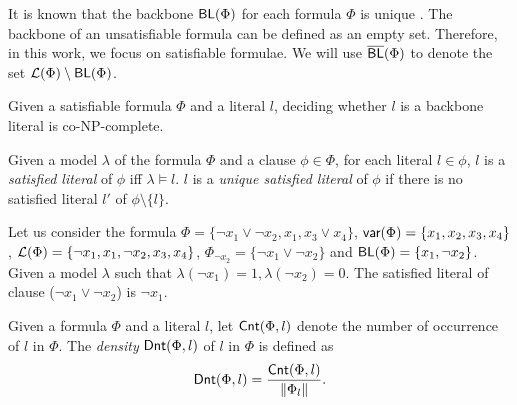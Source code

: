 It is known that the backbone $\textsf{BL}(\Phi)$ for each formula $\Phi$ is unique \cite{JLM15}.
The backbone of an unsatisfiable formula can be defined as an empty set. Therefore, in this work, we focus on satisfiable formulae.
We will use $\overline{\textsf{BL}}(\Phi)$ to denote the set
$\Lit(\Phi)\setminus \BL(\Phi)$.

\begin{theorem}
\label{thm:co-NP}\cite{Jan10}
Given a satisfiable formula $\Phi$ and a literal $l$, deciding whether $l$ is a backbone literal is co-NP-complete.
\end{theorem}

\begin{definition}
Given a model $\lambda$ of the formula $\Phi$ and a clause $\phi\in\Phi$, for each literal $l\in\phi$, $l$ is a \emph{satisfied literal}
of $\phi$ iff $\lambda\models l$. $l$ is a \emph{unique satisfied literal} of $\phi$ if there is no satisfied literal $l'$ of $\phi\setminus\{l\}$.
\end{definition}

Let us consider the formula $\Phi=\{\neg x_1 \vee \neg x_2, x_1, x_3 \vee x_4\}$,
$\textsf{var}(\Phi)=\{x_1, x_2, x_3, x_4\}$, $\Lit(\Phi)=\{\neg x_1, x_1, \neg x_2, x_3, x_4\}$, $\Phi_{\neg x_2}=\{\neg x_1 \vee \neg x_2\}$ and $\textsf{BL}(\Phi)=\{x_1, \neg x_2\}$.
Given a model $\lambda$ such that $\lambda(\neg x_1)=1,\lambda(\neg x_2)=0$. The satisfied literal of clause ($\neg x_1\vee\neg x_2$) is $\neg x_1$.

Given a formula $\Phi$ and a literal $l$, let $\textsf{Cnt}(\Phi,l)$ denote the number of occurrence of $l$ in $\Phi$.
The \emph{density} $\textsf{Dnt}(\Phi,l)$ of $l$ in $\Phi$ is defined as
\[
\textsf{Dnt}(\Phi, l)=\frac{\textsf{Cnt}(\Phi,l)}{\|\Phi_l\|}.
\]
